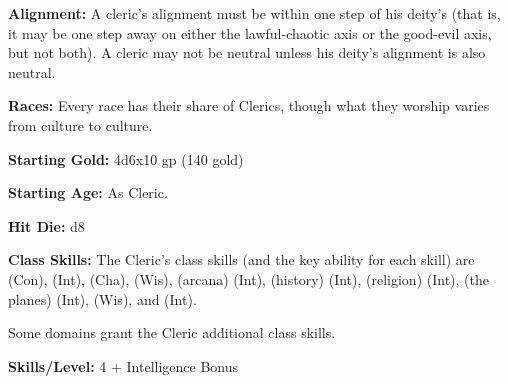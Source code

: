 
\textbf{Alignment:} A cleric's alignment must be within one step of his deity's (that is, it may be one step away on either the lawful-chaotic axis or the good-evil axis, but not both). A cleric may not be neutral unless his deity's alignment is also neutral.

\textbf{Races:} Every race has their share of Clerics, though what they worship varies from culture to culture.

\textbf{Starting Gold:} 4d6x10 gp (140 gold)

\textbf{Starting Age:} As Cleric.

\textbf{Hit Die:} d8

\textbf{Class Skills:} The Cleric's class skills (and the key ability for each skill) are  (Con),  (Int),  (Cha),  (Wis),  (arcana) (Int),  (history) (Int),  (religion) (Int),  (the planes) (Int),  (Wis), and  (Int).

Some domains grant the Cleric additional class skills.

\textbf{Skills/Level:} 4 + Intelligence Bonus

\modebab{}
\poorfor{}
\poorref{}
\goodwil{}

\begin{fullcastingclasstable}
\end{fullcastingclasstable}

